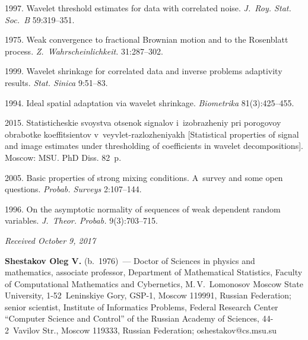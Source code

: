 \begin{multicols}{2}
{{\begin{thebibliography}{99}
 1997.  
Wavelet threshold estimates for data with correlated noise. 
\textit{J.~Roy. Stat. Soc.~B} 59:319--351.

 1975.  Weak convergence to fractional Brownian motion and to 
the Rosenblatt process. \textit{Z.~Wahrscheinlichkeit.} 31:287--302.

 1999. Wavelet shrinkage for correlated data and inverse 
problems adaptivity results.  \textit{Stat. Sinica} 9:51--83.



 1994. Ideal spatial adaptation via 
wavelet shrinkage. \textit{Biometrika} 81(3):425--455.

 2015. Statisticheskie svoystva otsenok signalov 
i~izobrazheniy pri porogovoy obrabotke ko\-ef\-fi\-tsi\-en\-tov v~veyvlet-razlozheniyakh
[Statistical properties of signal and 
image estimates under thresholding of coefficients in wavelet 
decompositions].   Moscow: MSU. PhD Diss. 82~p. 

 2005. 
Basic properties of strong mixing conditions. A~survey and some open questions. 
\textit{Probab. Surveys}  2:107--144.

 1996. On the asymptotic normality of sequences of 
weak dependent random variables. \textit{J.~Theor. Probab.} 9(3):703--715.
\end{thebibliography}

 }
 }

\end{multicols}

\vspace*{-3pt}

\hfill{\small\textit{Received October 9, 2017}}




\Contrl

\noindent
\textbf{Shestakov Oleg V.} (b.\ 1976)~--- 
Doctor of Sciences in physics and mathematics, associate professor, 
Department of Mathematical Statistics, Faculty of Computational Mathematics 
and Cybernetics, M.\,V.~Lomonosov Moscow State University, 1-52~Leninskiye Gory, 
GSP-1, Moscow 119991, Russian Federation; senior scientist, Institute of 
Informatics Problems, Federal Research Center ``Computer Science and Control''
of the Russian Academy of Sciences, 44-2~Vavilov Str., Moscow 119333, 
Russian Federation; \mbox{oshestakov@cs.msu.su}
\label{end\stat}


\renewcommand{\bibname}{\protect\rm Литература} 